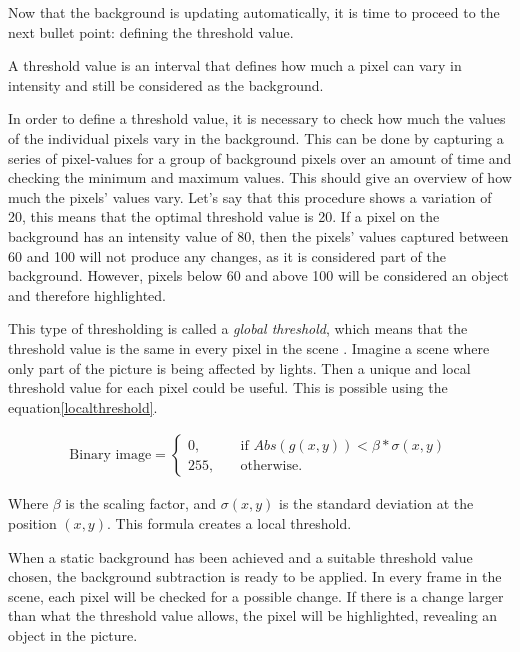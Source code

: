 Now that the background is updating automatically, it is time to proceed to the next bullet point: defining the threshold value.

A threshold value is an interval that defines how much a pixel can vary in intensity and still be considered as the background.

In order to define a threshold value, it is necessary to check how much the values of the individual pixels vary in the background. This can be done by capturing a series of pixel-values for a group of background pixels over an amount of time and checking the minimum and maximum values. This should give an overview of how much the pixels' values vary. Let's say that this procedure shows a variation of 20, this means that the optimal threshold value is 20. If a pixel on the background has an intensity value of 80, then the pixels' values captured between 60 and 100 will not produce any changes, as it is considered part of the background. However, pixels below 60 and above 100 will be considered an object and therefore highlighted.

This type of thresholding is called a \textit{global threshold}, which means that the threshold value is the same in every pixel in the scene \citep{ip_book}. Imagine a scene where only part of the picture is being affected by lights. Then a unique and local threshold value for each pixel could be useful. This is possible using the equation\ref{localthreshold}.

\begin{equation}
	\begin{aligned}
  		\ \text{Binary image} = \left\{ \begin{array}{ll}
         0, \quad &\text{if } Abs(g(x,y))<\beta * \sigma(x,y)\\
        255, \quad &\text{otherwise}.
        \end{array} \right . \ 
        \label{localthreshold}  
 	\end{aligned}
\end{equation} 

Where $\beta$ is the scaling factor, and $\sigma(x,y)$ is the standard deviation at the position $(x,y)$. This formula creates a local threshold. 

When a static background has been achieved and a suitable threshold value chosen, the background subtraction is ready to be applied. In every frame in the scene, each pixel will be checked for a possible change. If there is a change larger than what the threshold value allows, the pixel will be highlighted, revealing an object in the picture.


